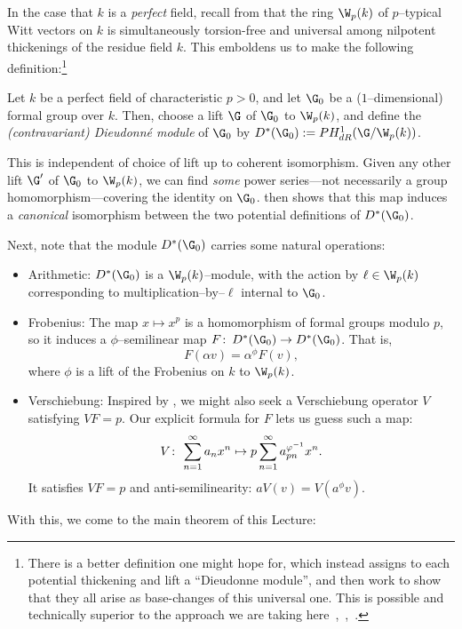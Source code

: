 In the case that \(k\) is a \emph{perfect} field, recall from  that the ring \(\W_p(k)\) of \(p\)--typical Witt vectors on \(k\) is simultaneously torsion-free and universal among nilpotent thickenings of the residue field \(k\).  This emboldens us to make the following definition:\footnote{There is a better definition one might hope for, which instead assigns to each potential thickening and lift a ``Dieudonne module'', and then work to show that they all arise as base-changes of this universal one.  This is possible and technically superior to the approach we are taking here~\cite[Theorem 5.1.6]{Katz},~\cite[Chapter 4]{Messing},~\cite{GrothendieckCristaux}.}

\begin{definition}{\cite[Section 5.5]{Katz}}
Let \(k\) be a perfect field of characteristic \(p > 0\), and let \(\G_0\) be a (\(1\)--dimensional) formal group over \(k\).  Then, choose a lift \(\G\) of \(\G_0\) to \(\W_p(k)\), and define the \textit{(contravariant) Dieudonn\'e module} of \(\G_0\) by \(D^*(\G_0) := PH^1_{dR}(\G / \W_p(k))\).
\end{definition}

\begin{remark}
This is independent of choice of lift up to coherent isomorphism.  Given any other lift \(\G'\) of \(\G_0\) to \(\W_p(k)\), we can find \emph{some} power series---not necessarily a group homomorphism---covering the identity on \(\G_0\).   then shows that this map induces a \emph{canonical} isomorphism between the two potential definitions of \(D^*(\G_0)\).
\end{remark}

Next, note that the module \(D^*(\G_0)\) carries some natural operations:
\begin{itemize}
\item Arithmetic: \(D^*(\G_0)\) is a \(\W_p(k)\)--module, with the action by \(\ell \in \W_p(k)\) corresponding to multiplication--by--\(\ell\) internal to \(\G_0\).
\item {}Frobenius: The map \(x \mapsto x^p\) is a homomorphism of formal groups modulo \(p\), so it induces a \(\phi\)--semilinear map \(F\co D^*(\G_0) \to D^*(\G_0)\).  That is, \[F(\alpha v) = \alpha^\phi F(v),\] where \(\phi\) is a lift of the Frobenius on \(k\) to \(\W_p(k)\).
\item {}Verschiebung: Inspired by , we might also seek a Verschiebung operator \(V\) satisfying \(VF = p\).  Our explicit formula for \(F\) lets us guess such a map: \[V\colon\thinspace \sum_{n=1}^\infty a_n x^n \mapsto p \sum_{n=1}^\infty a_{pn}^{\varphi^{-1}} x^n.\]  It satisfies \(VF = p\) and anti-semilinearity: \(aV(v) = V(a^\phi v)\).
\end{itemize}
With this, we come to the main theorem of this Lecture:


